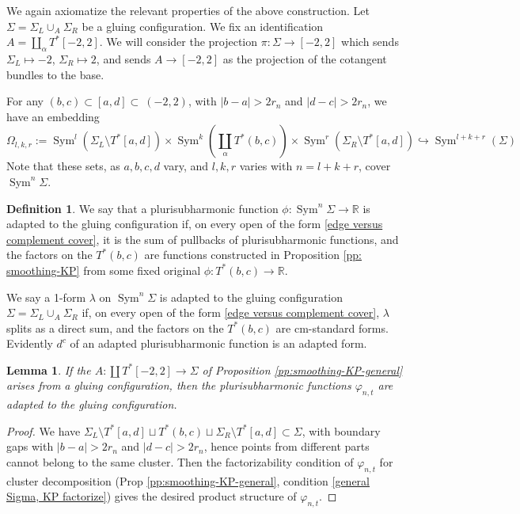 \documentclass{article}
\def\R{\mathbb{R}}
\def\In{\subset}
\DeclareMathOperator{\Sym}{Sym}
\newtheorem{lemma}[theorem]{Lemma}
\theoremstyle{definition}
\newtheorem{definition}
[theorem]{Definition}
\begin{document}
We again axiomatize the relevant properties of the above construction. 
Let $\Sigma = \Sigma_L \cup_A \Sigma_R$ be a gluing configuration.  We fix an identification $A = \coprod_\alpha T^* [-2,2]$.  We will consider the projection $\pi: \Sigma \to [-2,2]$ which sends $\Sigma_L \mapsto -2$, $\Sigma_R \mapsto 2$, and sends $A \to [-2,2]$ as the projection of the cotangent bundles to the base.  


For any $(b, c) \subset [a,d] \subset \ (-2,2)$, with $|b-a|>2r_n$ and $|d-c|>2r_n$, we have an embedding 
\begin{equation} \label{edge versus complement cover}
    \Omega_{l,k,r} := \Sym^{l}(\Sigma_L \setminus T^*[a,d]) \times 
    \Sym^k(\coprod_\alpha T^*(b,c)) \times \Sym^r(\Sigma_R \setminus T^*[a,d]) \hookrightarrow \Sym^{l+k+r}(\Sigma)
\end{equation}
Note that these sets, as $a, b,c,d$ vary, and $l,k,r$ varies with $n=l+k+r$, cover $\Sym^n \Sigma$. 
\begin{definition} \label{def: adapted}
    We say that a plurisubharmonic function $\phi: \Sym^n \Sigma \to \R$ is adapted to the gluing configuration if, on every open of the form \eqref{edge versus complement cover}, it is the sum of pullbacks of plurisubharmonic functions, and the factors on the $T^*(b,c)$ are functions constructed in Proposition \ref{pp: smoothing-KP} from some fixed original $\phi:T^*(b,c) \to \R$.  
    
    We say  a 1-form $\lambda$ on $\Sym^n \Sigma$ is adapted to the gluing configuration $\Sigma = \Sigma_L \cup_A \Sigma_R$ if, on every open of the form \eqref{edge versus complement cover}, $\lambda$ splits as a direct sum, and the factors on the $T^*(b,c)$ are cm-standard forms.
    Evidently $d^c$ of an adapted plurisubharmonic function is an adapted form. 
\end{definition}

\begin{lemma}
    If the $A: \coprod T^*[-2,2] \to \Sigma$ of  Proposition \ref{pp:smoothing-KP-general} arises from a gluing configuration, then the 
    plurisubharmonic functions $\varphi_{n,t}$ are adapted to the gluing configuration.  
\end{lemma}
\begin{proof}
We have $\Sigma_L \setminus T^*[a,d] \sqcup T^*(b,c) \sqcup \Sigma_R \setminus T^*[a,d] \In \Sigma$, with boundary gaps with $|b-a|>2r_n$ and $|d-c|>2r_n$, hence points from different parts cannot belong to the same cluster. Then the factorizability condition of $\varphi_{n,t}$ for cluster decomposition (Prop \ref{pp:smoothing-KP-general}, condition \ref{general Sigma, KP factorize}) gives the desired product structure of $\varphi_{n,t}$. 
\end{proof}
\end{document}
